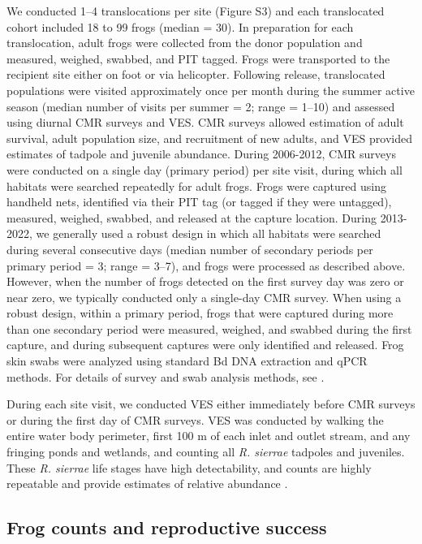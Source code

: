 \documentclass[9pt,twocolumn,twoside,lineno]{pnas-new}
\begin{document}
{We conducted 1--4 translocations per site (Figure S3) and
each translocated cohort included 18 to 99 frogs (median = 30). In
preparation for each translocation, adult frogs were collected from the
donor population and measured, weighed, swabbed, and PIT tagged. Frogs
were transported to the recipient site either on foot or via helicopter.
Following release, translocated populations were visited approximately
once per month during the summer active season (median number of visits
per summer = 2; range = 1--10) and assessed using diurnal CMR surveys
and VES. CMR surveys allowed estimation of adult survival, adult
population size, and recruitment of new adults, and VES provided
estimates of tadpole and juvenile abundance. During 2006-2012, CMR
surveys were conducted on a single day (primary period) per site visit,
during which all habitats were searched repeatedly for adult frogs.
Frogs were captured using handheld nets, identified via their PIT tag
(or tagged if they were untagged), measured, weighed, swabbed, and
released at the capture location. During 2013-2022, we generally used a
robust design in which all habitats were searched during several
consecutive days (median number of secondary periods per primary period
= 3; range = 3--7), and frogs were processed as described above.
However, when the number of frogs detected on the first survey day was
zero or near zero, we typically conducted only a single-day CMR survey.
When using a robust design, within a primary period, frogs that were
captured during more than one secondary period were measured, weighed,
and swabbed during the first capture, and during subsequent captures
were only identified and released. Frog skin swabs were analyzed using
standard Bd DNA extraction and qPCR methods. For details of survey and
swab analysis methods, see \citep{joseph2018}.

During each site visit, we conducted VES either immediately before CMR
surveys or during the first day of CMR surveys. VES was conducted by
walking the entire water body perimeter, first 100 m of each inlet and
outlet stream, and any fringing ponds and wetlands, and counting all
\emph{R. sierrae} tadpoles and juveniles. These \emph{R. sierrae} life
stages have high detectability, and counts are highly repeatable and
provide estimates of relative abundance \citep{knapp2000}.

\hypertarget{frog-counts-and-reproductive-success}{%
\subsection*{Frog counts and reproductive
success}\label{frog-counts-and-reproductive-success}}

}
\end{document}
